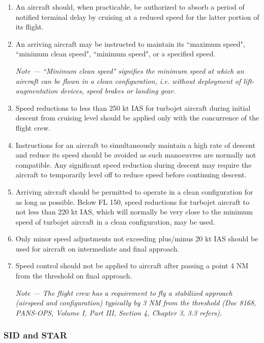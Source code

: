 \documentclass[../main.tex]{subfiles}
\begin{document}
    \begin{enumerate}
        \item An aircraft should, when practicable, be authorized to absorb a period of notified terminal delay by cruising at a reduced speed for the latter portion of its flight.
        \item An arriving aircraft may be instructed to maintain its ``maximum speed", ``minimum clean speed", ``minimum speed", or a specified speed.

        \textit{Note --- ``Minimum clean speed" signifies the minimum speed at which an aircraft can be flown in a clean configuration, i.e. without deployment of lift-augmentation devices, speed brakes or landing gear.}
        
        \item Speed reductions to less than 250 kt IAS for turbojet aircraft during initial descent from cruising level should be applied only with the concurrence of the flight crew.
        \item Instructions for an aircraft to simultaneously maintain a high rate of descent and reduce its speed should be avoided as such manoeuvres are normally not compatible. Any significant speed reduction during descent may require the aircraft to temporarily level off to reduce speed before continuing descent.
        \item Arriving aircraft should be permitted to operate in a clean configuration for as long as possible. Below FL 150, speed reductions for turbojet aircraft to not less than 220 kt IAS, which will normally be very close to the minimum speed of turbojet aircraft in a clean configuration, may be used.
        \item Only minor speed adjustments not exceeding plus/minus 20 kt IAS should be used for aircraft on intermediate and final approach.
        \item Speed control should not be applied to aircraft after passing a point 4 NM from the threshold on final approach.

        \textit{Note --- The flight crew has a requirement to fly a stabilized approach (airspeed and configuration) typically by 3 NM from the threshold (Doc 8168, PANS-OPS, Volume I, Part III, Section 4, Chapter 3, 3.3 refers).}
    \end{enumerate}

    \subsubsection{SID and STAR}
\end{document}

